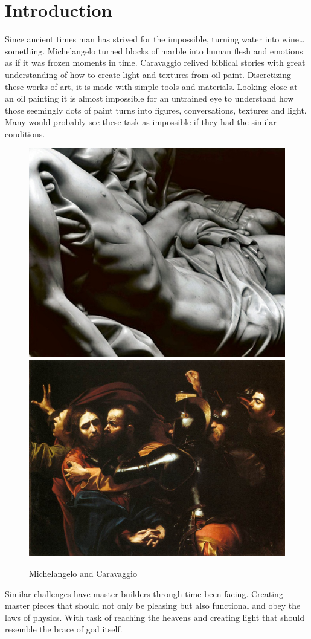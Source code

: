 \chapter{Introduction}

Since ancient times man has strived for the impossible, turning water into wine…something. 
Michelangelo turned blocks of marble into human flesh and emotions as if it was frozen moments in time. Caravaggio relived biblical stories with great understanding of how to create light and textures from oil paint. Discretizing these works of art, it is made with simple tools and materials. Looking close at an oil painting it is almost impossible for an untrained eye to understand how those seemingly dots of paint turns into figures, conversations, textures and light. Many would probably see these task as impossible if they had the similar conditions.

\begin{figure}[H]
\centering
\includegraphics[height=0.35\linewidth ]{figure/Introduction/Mich.jpg}
\includegraphics[height=0.35\linewidth ]{figure/Introduction/Caravaggio.jpg}
\caption{Michelangelo and Caravaggio}
\end{figure}

Similar challenges have master builders through time been facing. Creating master pieces that should not only be pleasing but also functional and obey the laws of physics. With task of reaching the heavens and creating light that should resemble the brace of god itself. 

